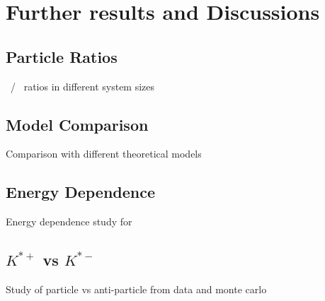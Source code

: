 \chapter{Further results and Discussions}
\label{cap:7}
\vspace*{2cm}

\section{Particle Ratios}
\label{cap:7.1}
\simplekstarch~/\kzero~ ratios in different system sizes


\section{Model Comparison}
\label{cap:7.2}
Comparison with different theoretical models 


\section{Energy Dependence}
\label{cap:7.3}
Energy dependence study for \simplekstarch~ 

\section{$K^{*+}$ vs $K^{*-}$}
\label{cap:7.4}
Study of particle vs anti-particle from data and monte carlo 
